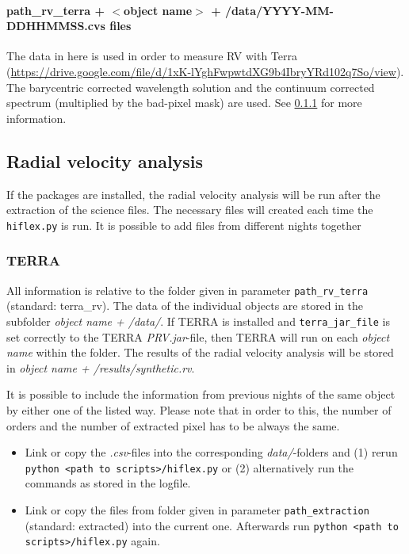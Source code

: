 \documentclass[10pt,a4paper]{article}
\begin{document}
\paragraph{path\_rv\_terra + $<$object name$>$ + /data/YYYY-MM-DDHHMMSS.cvs files}
The data in here is used in order to measure RV with Terra (\url{https://drive.google.com/file/d/1xK-lYghFwpwtdXG9b4IbryYRd102q7So/view}). The barycentric corrected wavelength solution and the continuum corrected spectrum (multiplied by the bad-pixel mask) are used. See \ref{Section:files_folders_rv_for_terra} for more information.



\subsection{Radial velocity analysis}
If the packages are installed, the radial velocity analysis will be run after the extraction of the science files. The necessary files will created each time the \verb|hiflex.py| is run. It is possible to add files from different nights together

\subsubsection{TERRA}
\label{Section:files_folders_rv_for_terra}
All information is relative to the folder given in parameter \verb|path_rv_terra| (standard: terra\_rv). 
The data of the individual objects are stored in the subfolder \textit{object name + /data/}. If TERRA is installed and \verb|terra_jar_file| is set correctly to the TERRA \textit{PRV.jar}-file, then TERRA will run on each \textit{object name} within the folder. The results of the radial velocity analysis will be stored in \textit{object name + /results/synthetic.rv}.

It is possible to include the information from previous nights of the same object by either one of the listed way. Please note that in order to this, the number of orders and the number of extracted pixel has to be always the same.
\begin{itemize}
  \item Link or copy the \textit{.csv}-files into the corresponding \textit{data/}-folders and (1) rerun \verb|python <path to scripts>/hiflex.py| or (2) alternatively run the commands as stored in the logfile.
  \item Link or copy the files from folder given in parameter \verb|path_extraction| (standard: extracted) into the current one. Afterwards run \verb|python <path to scripts>/hiflex.py| again.
\end{itemize}
\end{document}
